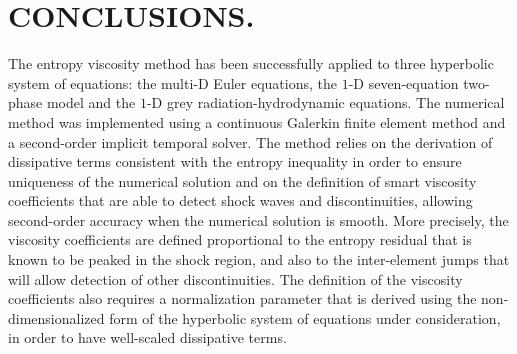 %
%
%


\chapter{\uppercase {Conclusions.}}\label{chap:conclusion}
%
The entropy viscosity method has been successfully applied to three hyperbolic system of equations: the multi-D Euler equations, the $1$-D seven-equation two-phase model and the $1$-D grey radiation-hydrodynamic equations. The numerical method was implemented using a continuous Galerkin finite element method and a second-order implicit temporal solver. The method relies on the derivation of dissipative terms consistent with the entropy inequality in order to ensure uniqueness of the numerical solution and on the definition of smart viscosity coefficients that are able to detect shock waves and discontinuities, allowing second-order accuracy when the numerical solution is smooth. More precisely, the viscosity coefficients are defined proportional to the entropy residual that is known to be peaked in the shock region, and also to the inter-element jumps that will allow detection of other discontinuities. The definition of the viscosity coefficients also requires a normalization parameter that is derived using the non-dimensionalized form of the hyperbolic system of equations under consideration, in order to have well-scaled dissipative terms.

